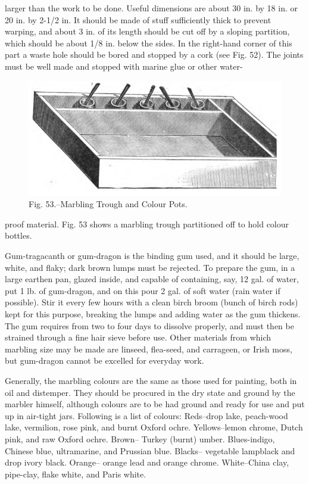 \documentclass[twoside]{book}
\begin{document}
larger than the work to be done. Useful dimensions
are about 30 in. by 18 in. or 20 in. by 2-1/2 in. It
should be made of stuff sufficiently thick to prevent
warping, and about 3 in. of its length should be
cut off by a sloping partition, which should be about
1/8 in. below the sides. In the right-hand corner of
this part a waste hole should be bored and stopped
by a cork (see Fig. 52). The joints must be well
made and stopped with marine glue or other water-
	\begin{figure}[h]
		\centering
		\includegraphics[width=\textwidth]{Figures/_053.png}
		\caption*{Fig. 53.--Marbling Trough and Colour Pots.}
	\end{figure}
proof material. Fig. 53 shows a marbling trough
partitioned off to hold colour bottles.

Gum-tragacanth or gum-dragon is the binding
gum used, and it should be large, white, and flaky;
dark brown lumps must be rejected. To prepare
the gum, in a large earthen pan, glazed inside, and
capable of containing, say, 12 gal. of water, put 1 lb.
of gum-dragon, and on this pour 2 gal. of soft water
(rain water if possible). Stir it every few hours
with a clean birch broom (bunch of birch rods) kept
for this purpose, breaking the lumps and adding
water as the gum thickens. The gum requires from
two to four days to dissolve properly, and must
then be strained through a fine hair sieve before
use. Other materials from which marbling size
may be made are linseed, flea-seed, and carrageen,
\pagebreak
or Irish moss, but gum-dragon cannot be excelled
for everyday work.

Generally, the marbling colours are the same as
those used for painting, both in oil and distemper.
They should be procured in the dry state and
ground by the marbler himself, although colours
are to be had ground and ready for use and put up
in air-tight jars. Following is a list of colours:
Reds--drop lake, peach-wood lake, vermilion, rose
pink, and burnt Oxford ochre. Yellows--lemon
chrome, Dutch pink, and raw Oxford ochre. Brown--
Turkey (burnt) umber. Blues-indigo, Chinese
blue, ultramarine, and Prussian blue. Blacks--
vegetable lampblack and drop ivory black. Orange--
orange lead and orange chrome. White--China clay,
pipe-clay, flake white, and Paris white.
\end{document}
